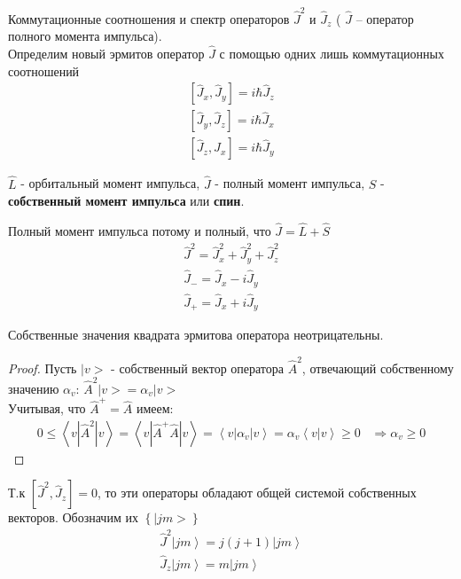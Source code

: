 \documentclass[__main__.tex]{subfiles}
\begin{document}
Коммутационные соотношения и спектр операторов $\hat{J}^2$ и $\hat{J}_z$ ( $\hat{J}$ -- оператор полного момента импульса).\\

Определим новый эрмитов оператор $\hat{J}$ с помощью одних лишь коммутационных соотношений
\begin{gather*}
    \left[\hat{J}_x,\hat{J}_y\right] = i\hbar\hat{J}_z\\
    \left[\hat{J}_y,\hat{J}_z\right] = i\hbar\hat{J}_x\\
    \left[\hat{J}_z,\hat{J}_x\right] = i\hbar\hat{J}_y
\end{gather*}
\begin{definition}
    $\hat{L}$ -  орбитальный момент импульса, $\hat{J}$ - полный момент импульса, $\hat{S}$ - \textbf{собственный момент импульса} или \textbf{спин}.
\end{definition}
Полный момент импульса потому и полный, что $\hat{J} = \hat{L}+\hat{S}$
\begin{gather*}
    \hat{J}^2 = \hat{J}^2_x+\hat{J}^2_y+\hat{J}^2_z\\
    \hat{J}_{-} = \hat{J}_x-i\hat{J}_y\\
    \hat{J}_{+} = \hat{J}_x+i\hat{J}_y
\end{gather*}
\begin{theorem}
    Собственные значения квадрата эрмитова оператора неотрицательны.
\end{theorem}
\begin{proof}
    Пусть $|v>$ - собственный вектор оператора $\hat{A}^2$, отвечающий собственному значению $\alpha_v$: $\hat{A}^2|v> = \alpha_v|v>$\\
    Учитывая, что $\hat{A}^{+} = \hat{A}$ имеем:
    \begin{gather*}
        0 \leq \left<v|\hat{A}^2|v\right> = \left<v|\hat{A}^{+}\hat{A}|v\right> = \left<v|\alpha_v|v\right> = \alpha_v\left<v|v\right> \geq 0\;\;\;\Rightarrow \alpha_v \geq 0
    \end{gather*}
\end{proof}
Т.к $\left[\hat{J}^2,\hat{J}_z\right] = 0$, то эти операторы обладают общей системой собственных векторов. Обозначим их $\left\{|jm>\right\}$
\begin{gather*}
    \hat{J}^2\left|jm\right> = j(j+1)\left|jm\right>\\
    \hat{J}_z\left|jm\right> = m\left|jm\right>
\end{gather*}
\end{document}
